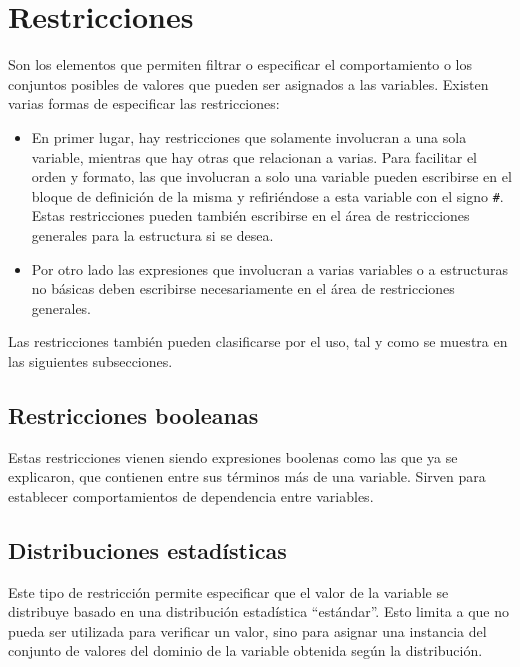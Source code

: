 \section{Restricciones}
Son los elementos que permiten filtrar o especificar el comportamiento o los 
conjuntos posibles de valores que pueden ser asignados a las variables. Existen 
varias formas de especificar  las restricciones:

\begin{itemize}
\item {En primer lugar, hay restricciones que solamente involucran a una sola variable,
mientras que hay otras que relacionan a varias. Para facilitar el orden y 
formato, las que involucran a solo una variable pueden escribirse en el bloque 
de definición de la misma y refiriéndose a esta variable con el signo \texttt{\#}. Estas restricciones 
pueden también escribirse en el área de restricciones generales para la 
estructura si se desea.}
\item {Por otro lado las expresiones que involucran a varias variables o a estructuras 
no básicas deben escribirse necesariamente en el área de restricciones generales.}
\end{itemize}

Las restricciones también pueden clasificarse por el uso, tal y como se muestra
en las siguientes subsecciones.

\subsection{Restricciones booleanas}
Estas restricciones vienen siendo expresiones boolenas como las que ya se 
explicaron, que contienen entre sus términos más de una variable. Sirven para 
establecer comportamientos de dependencia entre variables.
	
\subsection{Distribuciones estadísticas}
Este tipo de restricción permite especificar que el valor de la variable se 
distribuye basado en una distribución estadística ``estándar''. Esto limita a 
que no pueda ser utilizada para verificar un valor, sino para asignar una
instancia del conjunto de valores del dominio de la variable obtenida según la distribución.
	
